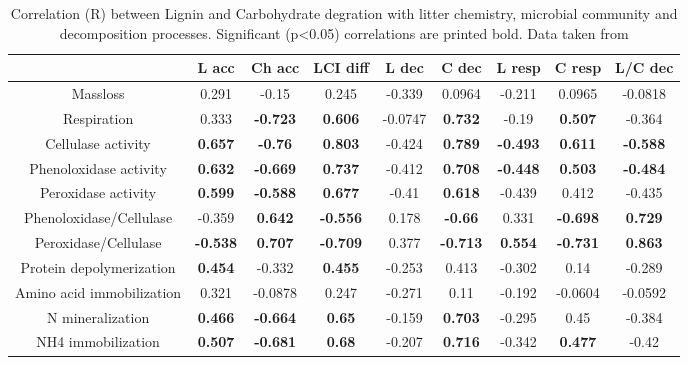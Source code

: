 \documentclass[authoryear,preprint,review,12pt]{elsarticle}
\begin{document}
\newpage
\begin{table}[h!]
\begin{center}
\caption{Correlation (R) between Lignin and Carbohydrate degration with litter chemistry, microbial community and decomposition processes. Significant (p<0.05) correlations are printed bold. Data taken from \cite{Mooshammer2011, Leitner2011, Frank2011}}
\label{corrtable}
{\tiny
\begin{tabular}{ccccccccc}
  \hline
 & L acc & Ch acc & LCI diff & L dec & C dec & L resp & C resp & L/C dec \\ 
  \hline
Massloss & 0.291 & -0.15 & 0.245 & -0.339 & 0.0964 & -0.211 & 0.0965 & -0.0818 \\ 
  Respiration & 0.333 & \textbf{ -0.723 } & \textbf{ 0.606 } & -0.0747 & \textbf{ 0.732 } & -0.19 & \textbf{ 0.507 } & -0.364 \\ 
  Cellulase activity & \textbf{ 0.657 } & \textbf{ -0.76 } & \textbf{ 0.803 } & -0.424 & \textbf{ 0.789 } & \textbf{ -0.493 } & \textbf{ 0.611 } & \textbf{ -0.588 } \\ 
  Phenoloxidase activity & \textbf{ 0.632 } & \textbf{ -0.669 } & \textbf{ 0.737 } & -0.412 & \textbf{ 0.708 } & \textbf{ -0.448 } & \textbf{ 0.503 } & \textbf{ -0.484 } \\ 
  Peroxidase activity & \textbf{ 0.599 } & \textbf{ -0.588 } & \textbf{ 0.677 } & -0.41 & \textbf{ 0.618 } & -0.439 & 0.412 & -0.435 \\ 
  Phenoloxidase/Cellulase & -0.359 & \textbf{ 0.642 } & \textbf{ -0.556 } & 0.178 & \textbf{ -0.66 } & 0.331 & \textbf{ -0.698 } & \textbf{ 0.729 } \\ 
  Peroxidase/Cellulase & \textbf{ -0.538 } & \textbf{ 0.707 } & \textbf{ -0.709 } & 0.377 & \textbf{ -0.713 } & \textbf{ 0.554 } & \textbf{ -0.731 } & \textbf{ 0.863 } \\ 
  Protein depolymerization & \textbf{ 0.454 } & -0.332 & \textbf{ 0.455 } & -0.253 & 0.413 & -0.302 & 0.14 & -0.289 \\ 
  Amino acid immobilization & 0.321 & -0.0878 & 0.247 & -0.271 & 0.11 & -0.192 & -0.0604 & -0.0592 \\ 
  N mineralization & \textbf{ 0.466 } & \textbf{ -0.664 } & \textbf{ 0.65 } & -0.159 & \textbf{ 0.703 } & -0.295 & 0.45 & -0.384 \\ 
  NH4 immobilization & \textbf{ 0.507 } & \textbf{ -0.681 } & \textbf{ 0.68 } & -0.207 & \textbf{ 0.716 } & -0.342 & \textbf{ 0.477 } & -0.42 \\ 

\end{tabular}}
\end{center}
\end{table}
\end{document}
